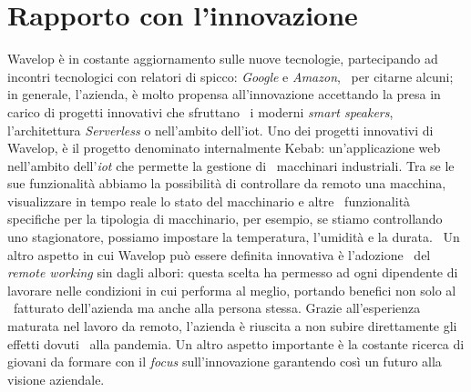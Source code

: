 \section{Rapporto con l'innovazione}
Wavelop è in costante aggiornamento sulle nuove tecnologie, partecipando ad incontri tecnologici con relatori di spicco: \emph{Google} e \emph{Amazon}, \
per citarne alcuni; in generale, l'azienda, è molto propensa all'innovazione accettando la presa in carico di progetti innovativi che sfruttano \
i moderni \emph{smart speakers}, l'architettura \emph{Serverless} o nell'ambito dell'\acrfull{iot}. 
Uno dei progetti innovativi di Wavelop, è il progetto denominato internalmente Kebab: un'applicazione web nell'ambito dell'\emph{\acrshort{iot}} che permette la gestione di \
macchinari industriali. Tra se le sue funzionalità abbiamo la possibilità di controllare da remoto una macchina, visualizzare in tempo reale lo stato del macchinario e altre \
funzionalità specifiche per la tipologia di macchinario, per esempio, se stiamo controllando uno stagionatore, possiamo impostare la temperatura, l'umidità e la durata. \
Un altro aspetto in cui Wavelop può essere definita innovativa è l'adozione \
del \emph{remote working} sin dagli albori: questa scelta ha permesso ad ogni dipendente di lavorare nelle condizioni in cui performa al meglio, portando benefici non solo al \
fatturato dell'azienda ma anche alla persona stessa. Grazie all'esperienza maturata nel lavoro da remoto, l'azienda è riuscita a non subire direttamente gli effetti dovuti \
alla pandemia. Un altro aspetto importante è la costante ricerca di giovani da formare con il \emph{focus} sull'innovazione garantendo così un futuro alla visione aziendale.